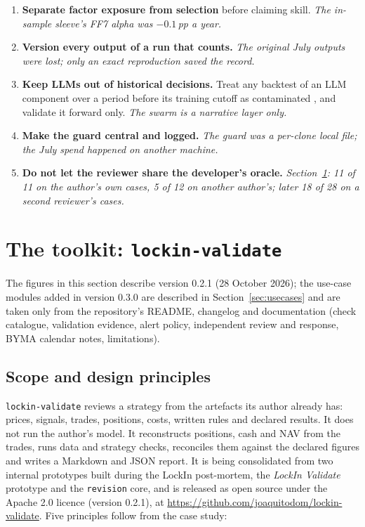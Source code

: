 \documentclass[11pt]{article}
\begin{document}
\begin{enumerate}[leftmargin=*,itemsep=2pt]
\item \textbf{Separate factor exposure from selection} before claiming skill. \emph{The in-sample sleeve's FF7 alpha was $-0.1$\,pp a year.}
\item \textbf{Version every output of a run that counts.} \emph{The original July outputs were lost; only an exact reproduction saved the record.}
\item \textbf{Keep LLMs out of historical decisions.} Treat any backtest of an LLM component over a period before its training cutoff as contaminated \citep{LopezLiraTangZhu2025,LiEtAl2025ProfitMirage}, and validate it forward only. \emph{The swarm is a narrative layer only.}
\item \textbf{Make the guard central and logged.} \emph{The guard was a per-clone local file; the July spend happened on another machine.}
\item \textbf{Do not let the reviewer share the developer's oracle.} \emph{Section~\ref{sec:toolkit}: 11 of 11 on the author's own cases, 5 of 12 on another author's; later 18 of 28 on a second reviewer's cases.}
\end{enumerate}

\section{The toolkit: \texttt{lockin-validate}}\label{sec:toolkit}

The figures in this section describe version 0.2.1 (28 October 2026); the use-case modules added in version 0.3.0 are described in Section~\ref{sec:usecases} and are taken only from the repository's README, changelog and documentation (check catalogue, validation evidence, alert policy, independent review and response, BYMA calendar notes, limitations).

\subsection{Scope and design principles}

\texttt{lockin-validate} reviews a strategy from the artefacts its author already has: prices, signals, trades, positions, costs, written rules and declared results. It does not run the author's model. It reconstructs positions, cash and NAV from the trades, runs data and strategy checks, reconciles them against the declared figures and writes a Markdown and JSON report. It is being consolidated from two internal prototypes built during the LockIn post-mortem, the \emph{LockIn Validate} prototype and the \texttt{revision} core, and is released as open source under the Apache 2.0 licence (version 0.2.1), at \url{https://github.com/joaquitodom/lockin-validate}. Five principles follow from the case study:
\end{document}
